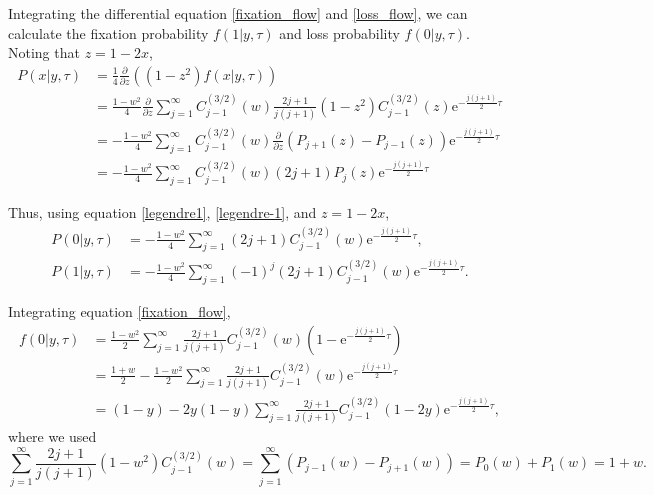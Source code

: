 \documentclass[12pt]{article}
\newcommand{\napier}{\mathrm{e}}
\newcommand{\henbibun}[2]{\frac{\partial {#1}}{\partial {#2}}}
\begin{document}
Integrating the differential equation \eqref{fixation_flow} and \eqref{loss_flow}, we can calculate the fixation probability $f(1|y,\tau)$ and loss probability $f(0|y,\tau)$.
Noting that $z = 1-2x$,
\begin{align}
 P(x|y, \tau) & = \frac{1}{4} \henbibun{}{z} \left( (1-z^2) f(x|y,\tau)\right)\\
 & = \frac{1-w^2}{4} \henbibun{}{z} \sum_{j=1}^{\infty} C^{(3/2)}_{j-1} (w) \frac{2j+1}{j(j+1)} (1-z^2) C^{(3/2)}_{j-1} (z) \napier^{-\frac{j(j+1)}{2}\tau}\\
 & = - \frac{1-w^2}{4} \sum_{j=1}^{\infty} C^{(3/2)}_{j-1} (w) \henbibun{}{z} \left( P_{j+1}(z) - P_{j-1}(z) \right) \napier^{-\frac{j(j+1)}{2}\tau}\\
 & = - \frac{1-w^2}{4} \sum_{j=1}^{\infty} C^{(3/2)}_{j-1} (w) (2j+1)P_{j}(z) \napier^{-\frac{j(j+1)}{2}\tau}
\end{align}

Thus, using equation \eqref{legendre1}, \eqref{legendre-1}, and $z=1-2x$,
\begin{align}
 P(0|y, \tau) & = - \frac{1-w^2}{4} \sum_{j=1}^{\infty} (2j+1) C^{(3/2)}_{j-1} (w) \napier^{-\frac{j(j+1)}{2}\tau},\\
 P(1|y, \tau) & = - \frac{1-w^2}{4} \sum_{j=1}^{\infty} (-1)^j (2j+1) C^{(3/2)}_{j-1} (w) \napier^{-\frac{j(j+1)}{2}\tau}.
\end{align}

Integrating equation \eqref{fixation_flow},
\begin{align}
 f(0|y,\tau) & = \frac{1-w^2}{2} \sum_{j=1}^{\infty} \frac{2j+1}{j(j+1)} C^{(3/2)}_{j-1} (w) \left(1 - \napier^{-\frac{j(j+1)}{2}\tau} \right)\\
 & = \frac{1+w}{2} - \frac{1-w^2}{2} \sum_{j=1}^{\infty} \frac{2j+1}{j(j+1)} C^{(3/2)}_{j-1} (w) \napier^{-\frac{j(j+1)}{2}\tau}\\
 & = (1-y) - 2y(1-y) \sum_{j=1}^{\infty} \frac{2j+1}{j(j+1)} C^{(3/2)}_{j-1} (1-2y) \napier^{-\frac{j(j+1)}{2}\tau},
\end{align}
where we used
\begin{equation}
 \sum_{j=1}^{\infty}\frac{2j+1}{j(j+1)}(1-w^2) C^{(3/2)}_{j-1} (w) = \sum_{j=1}^{\infty} \left( P_{j-1}(w) - P_{j+1}(w) \right) = P_{0}(w) + P_{1}(w) = 1+w.
\end{equation}
\end{document}
